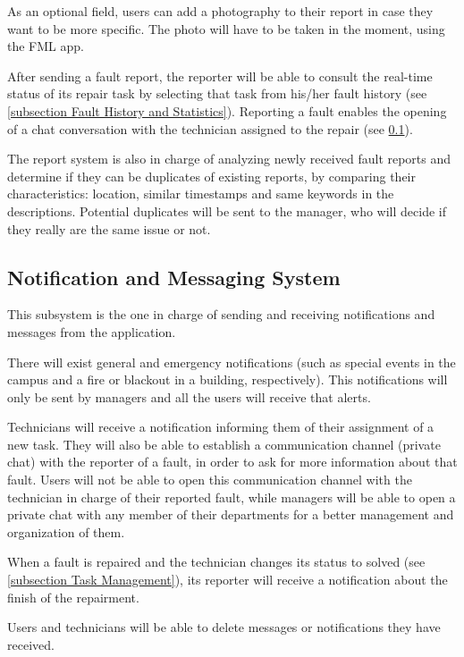 As an optional field, users can add a photography to their report in case they want to be more specific. The photo will have to be taken in the moment, using the FML app.

After sending a fault report, the reporter will be able to consult the real-time status of its repair task by selecting that task from his/her fault history (see \ref{subsection Fault History and Statistics}). Reporting a fault enables the opening of a chat conversation with the technician assigned to the repair (see \ref{subsection Notification and Messaging System}).

The report system is also in charge of analyzing newly received fault reports and determine if they can be duplicates of existing reports, by comparing their characteristics: location, similar timestamps and same keywords in the descriptions. Potential duplicates will be sent to the manager, who will decide if they really are the same issue or not.

\subsection{Notification and Messaging System}
\label{subsection Notification and Messaging System}
This subsystem is the one in charge of sending and receiving notifications and messages from the application.

There will exist general and emergency notifications (such as special events in the campus and a fire or blackout in a building, respectively). This notifications will only be sent by managers and all the users will receive that alerts.

Technicians will receive a notification informing them of their assignment of a new task. They will also be able to establish a communication channel (private chat) with the reporter of a fault, in order to ask for more information about that fault. Users will not be able to open this communication channel with the technician in charge of their reported fault, while managers will be able to open a private chat with any member of their departments for a better management and organization of them.

When a fault is repaired and the technician changes its status to solved (see \ref{subsection Task Management}), its reporter will receive a notification about the finish of the repairment.

Users and technicians will be able to delete messages or notifications they have received.

